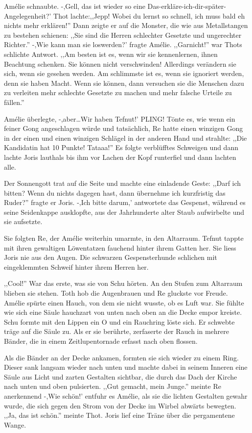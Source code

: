\documentclass[11pt,titlepage,a5paper]{book}
\begin{document}
Amélie schnaubte. -,Gell, das ist wieder so eine Das-erkläre-ich-dir-später-Angelegenheit?' Thot lachte:,,Jepp! Wobei du lernst so schnell, ich muss bald eh nichts mehr erklären!'' Dann zeigte er auf die Monster, die wie aus Metallstangen zu bestehen schienen: ,,Sie sind die Herren schlechter Gesetzte und ungerechter Richter.'' -,Wie kann man sie loswerden?' fragte Amélie. ,,Garnicht!'' war Thots schlichte Antwort. ,,Am besten ist es, wenn wir sie kennenlernen, ihnen Beachtung schenken. Sie können nicht verschwinden! Allerdings verändern sie sich, wenn sie gesehen werden. Am schlimmste ist es, wenn sie ignoriert werden, denn sie haben Macht. Wenn sie können, dann versuchen sie die Menschen dazu zu verleiten mehr schlechte Gesetzte zu machen und mehr falsche Urteile zu fällen.''

Amélie überlegte, -,aber\dots Wir haben Tefnut!' PLING! Tönte es, wie wenn ein feiner Gong angeschlagen würde und tatsächlich, Re hatte einen winzigen Gong in der einen und einen winzigen Schlägel in der anderen Hand und strahlte: ,,Die Kandidatin hat 10 Punkte! Tataaa!'' Es folgte verblüfftes Schweigen und dann lachte Joris lauthals bis ihm vor Lachen der Kopf runterfiel und dann lachten alle.

Der Sonnengott trat auf die Seite und machte eine einladende Geste: ,,Darf ich bitten? Wenn du nichts dagegen hast, dann übernehme ich kurzfristig das Ruder?'' fragte er Joris. -,Ich bitte darum,' antwortete das Gespenst, während es seine Seidenkappe ausklopfte, aus der Jahrhunderte alter Staub aufwirbelte und sie aufsetzte.

Sie folgten Re, der Amélie weiterhin umarmte, in den Altarraum. Tefnut tappte mit ihren gewaltigen Löwentatzen fauchend hinter ihrem Gatten her. Sie liess Joris nie aus den Augen. Die schwarzen Gespensterhunde schlichen mit eingeklemmten Schweif hinter ihrem Herren her.

,,Cool!'' War das erste, was sie von Schu hörten. An den Stufen zum Altarraum blieben sie stehen. Toth hob die Augenbrauen und Re gluckste vor Freude. Amélie spürte einen Hauch, von dem sie nicht wusste, ob es Luft war. Sie fühlte wie sich eine Säule hauchzart von unten nach oben an die Decke empor kreiste. Schu formte mit den Lippen ein O und ein Rauchring löste sich. Er schwebte träge auf die Säule zu. Als er sie berührte, zerfaserte der Rauch in mehrere Bänder, die in einem Zeitlupentornade erfasst nach oben flossen. 

Als die Bänder an der Decke ankamen, formten sie sich wieder zu einem Ring. Dieser sank langsam wieder nach unten und machte dabei in seinem Inneren eine Säule aus Licht und zarten Gestalten sichtbar, die durch das Dach der Kirche nach unten und oben pulsierten. ,,Gut gemacht, mein Junge.'' meinte Re anerkennend -,Wie schön!' entfuhr es Amélie, als sie die lichten Gestalten gewahr wurde, die sich gegen den Strom von der Decke im Wirbel abwärts bewegten. ,,Ja, das ist schön.'' meinte Thot. Joris lief eine Träne über die pergamentene Wange.
\end{document}
